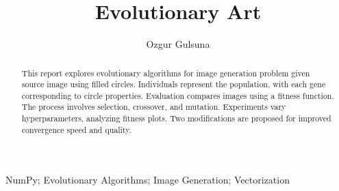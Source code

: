 \documentclass[3p,times,procedia]{elsarticle}
\begin{document}
\begin{frontmatter}





\title{\textbf{Evolutionary Art}}




\author[]{Ozgur Gulsuna} 

\address[]{Middle East Technical University, Electrical and Electronics Engineering, Ankara, Turkey}

\begin{abstract}

This report explores evolutionary algorithms for image generation problem given source image using filled circles. Individuals represent the population, with each gene corresponding to circle properties. Evaluation compares images using a fitness function. The process involves selection, crossover, and mutation. Experiments vary hyperparameters, analyzing fitness plots. Two modifications are proposed for improved convergence speed and quality.

\end{abstract}

\begin{keyword}
NumPy;
Evolutionary Algorithms;
Image Generation;
Vectorization

\end{keyword}

\end{frontmatter}
\end{document}
